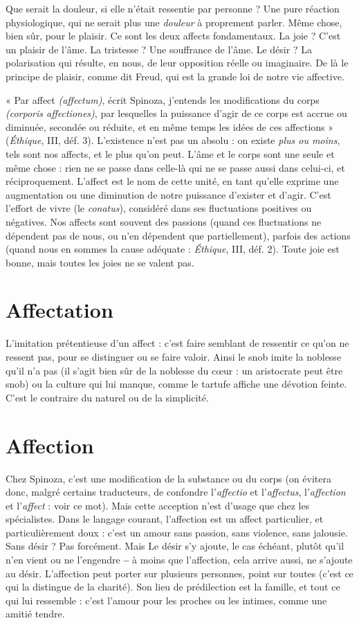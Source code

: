 Que serait la douleur, si elle n’était ressentie par personne ? Une pure réaction
physiologique, qui ne serait plus une {\it douleur} à proprement parler. Même
chose, bien sûr, pour le plaisir. Ce sont les deux affects fondamentaux. La joie ?
C’est un plaisir de l’âme. La tristesse ? Une souffrance de l’âme. Le désir ? La
polarisation qui résulte, en nous, de leur opposition réelle ou imaginaire. De là
le principe de plaisir, comme dit Freud, qui est la grande loi de notre vie affective.

« Par affect {\it (affectum)}, écrit Spinoza, j'entends les modifications du corps
{\it (corporis affectiones)}, par lesquelles la puissance d’agir de ce corps est accrue ou
diminuée, secondée ou réduite, et en même temps les idées de ces affections »
({\it Éthique}, III, déf. 3). L'existence n’est pas un absolu : on existe {\it plus ou moins},
tels sont nos affects, et le plus qu’on peut. L'âme et le corps sont une seule et
même chose : rien ne se passe dans celle-là qui ne se passe aussi dans celui-ci, et
réciproquement. L’affect est le nom de cette unité, en tant qu’elle exprime une
augmentation ou une diminution de notre puissance d’exister et d’agir. C’est
l'effort de vivre (le {\it conatus}), considéré dans ses fluctuations positives ou négatives.
Nos affects sont souvent des passions (quand ces fluctuations ne dépendent
pas de nous, ou n’en dépendent que partiellement), parfois des actions
(quand nous en sommes la cause adéquate : {\it Éthique}, III, déf. 2). Toute joie est
bonne, mais toutes les joies ne se valent pas.

\section{Affectation}
L’imitation prétentieuse d’un affect : c’est faire semblant de
ressentir ce qu'on ne ressent pas, pour se distinguer ou se
faire valoir. Ainsi le snob imite la noblesse qu’il n’a pas (il s’agit bien sûr de la
noblesse du cœur : un aristocrate peut être snob) ou la culture qui lui manque,
comme le tartufe affiche une dévotion feinte. C’est le contraire du naturel ou
de la simplicité.

\section{Affection}
Chez Spinoza, c’est une modification de la substance ou du
corps (on évitera donc, malgré certains traducteurs, de confondre
l’{\it affectio} et l’{\it affectus}, l'{\it affection} et l'{\it affect} : voir ce mot). Mais cette acception
n'est d'usage que chez les spécialistes. Dans le langage courant, l’affection est
un affect particulier, et particulièrement doux : c’est un amour sans passion,
sans violence, sans jalousie. Sans désir ? Pas forcément. Mais Le désir s’y ajoute,
le cas échéant, plutôt qu’il n’en vient ou ne l’engendre {\bf --} à moins que l’affection,
cela arrive aussi, ne s'ajoute au désir.
L’affection peut porter sur plusieurs personnes, point sur toutes (c’est ce
qui la distingue de la charité). Son lieu de prédilection est la famille, et tout ce
qui lui ressemble : c’est l'amour pour les proches ou les intimes, comme une
amitié tendre.


